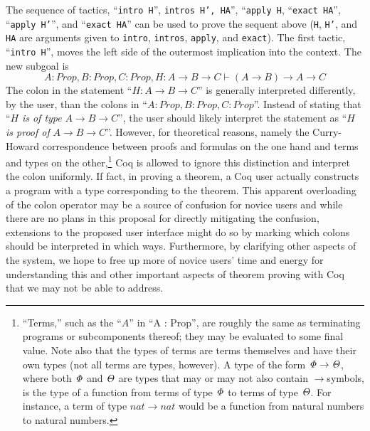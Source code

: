 \documentclass[11pt]{amsart}
\newcommand{\ra}{\ensuremath{\rightarrow}}
\begin{document}
The sequence of tactics, ``\texttt{intro H}'', \texttt{intros H', HA}'', ``\texttt{apply H}, ``\texttt{exact HA}'', ``\texttt{apply H'}'', and ``\texttt{exact HA}'' can be used to prove the sequent above (\texttt{H}, \texttt{H'}, and \texttt{HA} are arguments given to \texttt{intro}, \texttt{intros}, \texttt{apply}, and \texttt{exact}).  The first tactic, ``\texttt{intro H}'', moves the left side of the outermost implication into the context.  The new subgoal is
\[A : Prop, B : Prop, C : Prop, H : A \ra B \ra C \vdash (A \ra B) \ra A \ra C\]
The colon in the statement ``$H : A \ra B \ra C$'' is generally interpreted differently, by the user, than the colons in ``$A : Prop, B : Prop, C : Prop$''.  Instead of stating that ``$H$ \textit{is of type} $A \ra B \ra C$'', the user should likely interpret the statement as ``$H$ \textit{is proof of} $A \ra B \ra C$''.  However, for theoretical reasons, namely the Curry-Howard correspondence between proofs and formulas on the one hand and terms and types on the other,\footnote{``Terms,'' such as the ``$A$'' in ``A : Prop'', are roughly the same as terminating programs or subcomponents thereof; they may be evaluated to some final value.  Note also that the types of terms are terms themselves and have their own types (not all terms are types, however).  A type of the form $\it{\Phi} \ra \it{\Theta}$, where both $\it{\Phi}$ and $\it{\Theta}$ are types that may or may not also contain \ra symbols, is the type of a function from terms of type $\it{\Phi}$ to terms of type $\it{\Theta}$.  For instance, a term of type $nat \ra nat$ would be a function from natural numbers to natural numbers.} Coq is allowed to ignore this distinction and interpret the colon uniformly.  If fact, in proving a theorem, a Coq user actually constructs a program with a type corresponding to the theorem.  This apparent overloading of the colon operator may be a source of confusion for novice users and while there are no plans in this proposal for directly mitigating the confusion, extensions to the proposed user interface might do so by marking which colons should be interpreted in which ways.  Furthermore, by clarifying other aspects of the system, we hope to free up more of novice users' time and energy for understanding this and other important aspects of theorem proving with Coq that we may not be able to address. 
\end{document}
